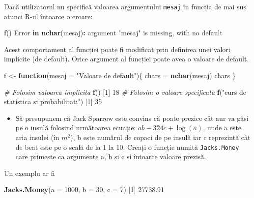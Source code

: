 \documentclass[]{article}
\newenvironment{Shaded}{\begin{snugshade}}{\end{snugshade}}
\newcommand{\KeywordTok}[1]{\textcolor[rgb]{0.13,0.29,0.53}{\textbf{#1}}}
\newcommand{\DataTypeTok}[1]{\textcolor[rgb]{0.13,0.29,0.53}{#1}}
\newcommand{\DecValTok}[1]{\textcolor[rgb]{0.00,0.00,0.81}{#1}}
\newcommand{\FloatTok}[1]{\textcolor[rgb]{0.00,0.00,0.81}{#1}}
\newcommand{\StringTok}[1]{\textcolor[rgb]{0.31,0.60,0.02}{#1}}
\newcommand{\CommentTok}[1]{\textcolor[rgb]{0.56,0.35,0.01}{\textit{#1}}}
\newcommand{\ControlFlowTok}[1]{\textcolor[rgb]{0.13,0.29,0.53}{\textbf{#1}}}
\newcommand{\OperatorTok}[1]{\textcolor[rgb]{0.81,0.36,0.00}{\textbf{#1}}}
\newcommand{\NormalTok}[1]{#1}
\newenvironment{frshaded*}{%
  \def\FrameCommand{\fboxrule=\FrameRule\fboxsep=\FrameSep \fcolorbox{framecolor}{shadecolor1}}%
  \MakeFramed {\advance\hsize-\width \FrameRestore}}%
{\endMakeFramed}
\newenvironment{rmdblock}[1]
  {\begin{frshaded*}
  \begin{itemize}
  \renewcommand{\labelitemi}{
    \raisebox{-.7\height}[0pt][0pt]{
      {\setkeys{Gin}{width=2em,keepaspectratio}\texttt{[image: images/icons/\#1]}}
    }
  }
  \item
  }
  {
  \end{itemize}
  \end{frshaded*}
  }
\newenvironment{rmdexercise}
  {\begin{rmdblock}{exercise}}
  {\end{rmdblock}}
\begin{document}
Dacă utilizatorul nu specifică valoarea argumentului \texttt{mesaj} în
funcția de mai sus atunci R-ul întoarce o eroare:

\begin{Shaded}
\begin{Highlighting}[]
\KeywordTok{f}\NormalTok{()}
\NormalTok{Error }\ControlFlowTok{in} \KeywordTok{nchar}\NormalTok{(mesaj)}\OperatorTok{:}\StringTok{ }\NormalTok{argument }\StringTok{"mesaj"}\NormalTok{ is missing, with no default}
\end{Highlighting}
\end{Shaded}

Acest comportament al funcției poate fi modificat prin definirea unei
valori implicite (de default). Orice argument al funcției poate avea o
valoare de default.

\begin{Shaded}
\begin{Highlighting}[]
\NormalTok{f <-}\StringTok{ }\ControlFlowTok{function}\NormalTok{(}\DataTypeTok{mesaj =} \StringTok{"Valoare de default"}\NormalTok{)\{}
\NormalTok{  chars =}\StringTok{ }\KeywordTok{nchar}\NormalTok{(mesaj)}
\NormalTok{  chars}
\NormalTok{\}}

\CommentTok{# Folosim valoarea implicita }
\KeywordTok{f}\NormalTok{()}
\NormalTok{[}\DecValTok{1}\NormalTok{] }\DecValTok{18}
\CommentTok{# Folosim o valoare specificata}
\KeywordTok{f}\NormalTok{(}\StringTok{"curs de statistica si probabilitati"}\NormalTok{)}
\NormalTok{[}\DecValTok{1}\NormalTok{] }\DecValTok{35}
\end{Highlighting}
\end{Shaded}

\begin{rmdexercise}
Să presupunem că Jack Sparrow este convins că poate prezice cât aur va
găsi pe o insulă folosind următoarea ecuație: \(ab - 324c + \log(a)\),
unde a este aria insulei (în \(m^2\)), b este numărul de copaci de pe
insulă iar c reprezintă cât de beat este pe o scală de la 1 la 10.
Creați o funcție numită \texttt{Jacks.Money} care primește ca argumente
a, b și c și întoarce valoare prezisă.
\end{rmdexercise}

Un exemplu ar fi

\begin{Shaded}
\begin{Highlighting}[]
\KeywordTok{Jacks.Money}\NormalTok{(}\DataTypeTok{a =} \DecValTok{1000}\NormalTok{, }\DataTypeTok{b =} \DecValTok{30}\NormalTok{, }\DataTypeTok{c =} \DecValTok{7}\NormalTok{)}
\NormalTok{[}\DecValTok{1}\NormalTok{] }\FloatTok{27738.91}
\end{Highlighting}
\end{Shaded}
\end{document}
